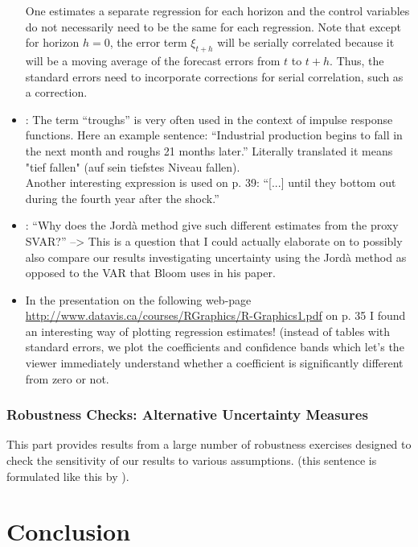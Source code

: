 \documentclass[a4paper,12pt,oneside,pointednumbers,bibtotoc,bigheadings,liststotoc]{scrbook}
\begin{document}
\begin{itemize}
	One estimates a separate regression for each horizon and the control variables do not necessarily need to be the same for each regression. Note that except for horizon $h=0$, the error term $\xi_{t+h}$ will be serially correlated because it will be a moving average of the forecast errors from $t$ to $t+h$. Thus, the standard errors need to incorporate corrections for serial correlation, such as a \citep{newest:87} correction.
	\item \citet[p. 37]{ramey:16}: The term ``troughs'' is very often used in the context of impulse response functions. Here an example sentence: ``Industrial production begins to fall in the next month and roughs 21 months later.'' Literally translated it means "tief fallen" (auf sein tiefstes Niveau fallen).\\
	Another interesting expression is used on p. 39: ``[...] until they bottom out during the fourth year after the shock.''
	\item \citet[p. 45]{ramey:16}: ``Why does the Jordà method give such different estimates from the proxy SVAR?'' --> This is a question that I could actually elaborate on to possibly also compare our results investigating uncertainty using the Jordà method as opposed to the VAR that Bloom uses in his paper.
	\item In the presentation on the following web-page \url{http://www.datavis.ca/courses/RGraphics/R-Graphics1.pdf} on p. 35 I found an interesting way of plotting regression estimates! (instead of tables with standard errors, we plot the coefficients and confidence bands which let's the viewer immediately understand whether a coefficient is significantly different from zero or not.
\end{itemize}


\subsection{Robustness Checks: Alternative Uncertainty Measures}
This part provides results from a large number of robustness exercises designed to check the sensitivity of our results to various assumptions. (this sentence is formulated like this by \citet{juradoetal:15}).

\chapter{Conclusion}
\label{Conclusion}




\newpage
\appendix
\end{document}

